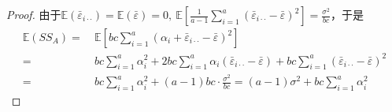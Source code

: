 \documentclass[12pt, a4paper, oneside]{ctexart}
\def\E{\mathbb{E}}         %
\begin{document}
\begin{proof}
    由于$\E(\bar{\varepsilon}_{i\cdot\cdot}) = \E(\bar{\varepsilon}) = 0,\ \E\left[\frac{1}{a-1}\sum_{i=1}^a(\bar{\varepsilon}_{i\cdot\cdot}-\bar{\varepsilon})^2\right] = \frac{\sigma^2}{bc}$，于是
    \begin{align*}
        \E(SS_A) =&\ \E\left[bc\sum_{i=1}^a(\alpha_i+\bar{\varepsilon}_{i\cdot\cdot}-\bar{\varepsilon})^2\right]\\
        =&\ bc \sum_{i=1}^a\alpha_i^2 + 2bc\sum_{i=1}^a\alpha_i(\bar{\varepsilon}_{i\cdot\cdot}-\bar{\varepsilon})+bc\sum_{i=1}^a(\bar{\varepsilon}_{i\cdot\cdot}-\bar{\varepsilon})^2\\
        =&\ bc\sum_{i=1}^a\alpha_i^2+(a-1)bc\cdot\frac{\sigma^2}{bc} = (a-1)\sigma^2+bc\sum_{i=1}^a\alpha_i^2
    \end{align*}
    

\end{proof}
\end{document}

